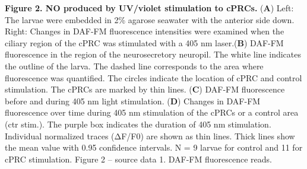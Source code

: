 \documentclass[
  11pt,
  letterpaper,
  DIV=11,
  numbers=noendperiod]{scrartcl}
\begin{document}
\textbf{Figure 2. NO produced by UV/violet stimulation to cPRCs.}
(\textbf{A}) Left: The larvae were embedded in 2\% agarose seawater with
the anterior side down. Right: Changes in DAF-FM fluorescence
intensities were examined when the ciliary region of the cPRC was
stimulated with a 405 nm laser.(\textbf{B}) DAF-FM fluorescence in the
region of the neurosecretory neuropil. The white line indicates the
outline of the larva. The dashed line corresponds to the area where
fluorescence was quantified. The circles indicate the location of cPRC
and control stimulation. The cPRCs are marked by thin lines.
(\textbf{C}) DAF-FM fluorescence before and during 405 nm light
stimulation. (\textbf{D}) Changes in DAF-FM fluorescence over time
during 405 nm stimulation of the cPRCs or a control area (ctr stim.).
The purple box indicates the duration of 405 nm stimulation. Individual
normalized traces (ΔF/F0) are shown as thin lines. Thick lines show the
mean value with 0.95 confidence intervals. N = 9 larvae for control and
11 for cPRC stimulation. Figure 2 -- source data 1. DAF-FM fluorescence
reads.
\end{document}
